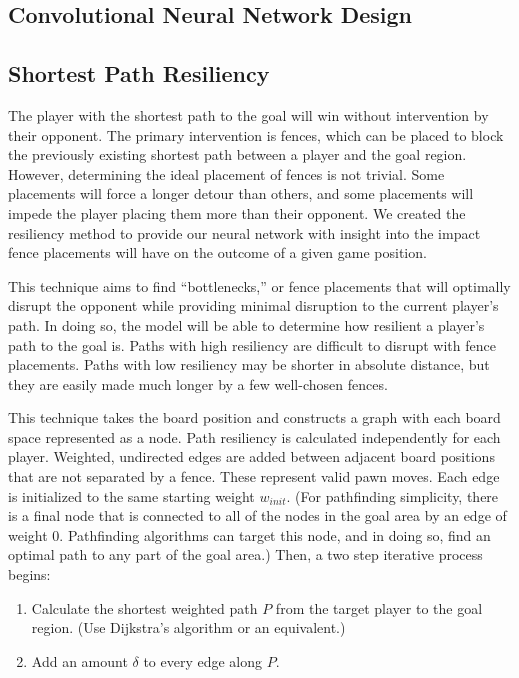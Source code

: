 \documentclass[10pt]{article}
\begin{document}
\subsection{Convolutional Neural Network Design}

\subsection{Shortest Path Resiliency}

The player with the shortest path to the goal will win without intervention by their opponent. The primary intervention is fences, which can be placed to block the previously existing shortest path between a player and the goal region. However, determining the ideal placement of fences is not trivial. Some placements will force a longer detour than others, and some placements will impede the player placing them more than their opponent. We created the resiliency method to provide our neural network with insight into the  impact fence placements will have on the outcome of a given game position.

This technique aims to find ``bottlenecks,'' or fence placements that will optimally disrupt the opponent while providing minimal disruption to the current player's path. In doing so, the model will be able to determine how resilient a player's path to the goal is. Paths with high resiliency are difficult to disrupt with fence placements. Paths with low resiliency may be shorter in absolute distance, but they are easily made much longer by a few well-chosen fences.

This technique takes the board position and constructs a graph with each board space represented as a node. Path resiliency is calculated independently for each player. Weighted, undirected edges are added between adjacent board positions that are not separated by a fence. These represent valid pawn moves. Each edge is initialized to the same starting weight $w_{init}$.
(For pathfinding simplicity, there is a final node that is connected to all of the nodes in the goal area by an edge of weight 0. Pathfinding algorithms can target this node, and in doing so, find an optimal path to any part of the goal area.) %
Then, a two step iterative process begins:

\begin{enumerate}
    \item Calculate the shortest weighted path $P$ from the target player to the goal region. (Use Dijkstra's algorithm or an equivalent.)
    \item Add an amount $\delta$ to every edge along $P$.
\end{enumerate}
\end{document}
